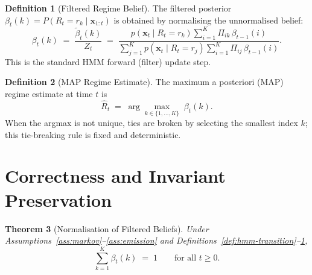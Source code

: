 \documentclass[12pt,openany]{book}
\newcommand{\bfx}{\mathbf{x}}
\numberwithin{equation}{chapter}
\theoremstyle{plain}
\newtheorem{theorem}{Theorem}[chapter]
\theoremstyle{definition}
\newtheorem{definition}[theorem]{Definition}
\theoremstyle{remark}
\numberwithin{equation}{chapter}
\theoremstyle{plain}
\begin{document}
\begin{definition}[Filtered Regime Belief]
\label{def:hmm-belief}
The filtered posterior $\beta_t(k) = P(R_t = r_k \mid \bfx_{1:t})$ is
obtained by normalising the unnormalised belief:
\begin{equation}
  \beta_t(k)
  \;=\;
  \frac{\tilde{\beta}_t(k)}{Z_t}
  \;=\;
  \frac{
    p\!\left(\bfx_t \mid R_t = r_k\right)
    \displaystyle\sum_{i=1}^{K}\Pi_{ik}\,\beta_{t-1}(i)
  }{
    \displaystyle\sum_{j=1}^{K}
    p\!\left(\bfx_t \mid R_t = r_j\right)
    \displaystyle\sum_{i=1}^{K}\Pi_{ij}\,\beta_{t-1}(i)
  }.
  \label{eq:hmm-update}
\end{equation}
This is the standard HMM forward (filter) update step.
\end{definition}

\begin{definition}[MAP Regime Estimate]
\label{def:map-regime}
The maximum a posteriori (MAP) regime estimate at time $t$ is
\begin{equation}
  \hat{R}_t
  \;=\;
  \arg\max_{k \in \{1,\ldots,K\}}\;\beta_t(k).
  \label{eq:map-regime}
\end{equation}
When the argmax is not unique, ties are broken by selecting the smallest
index $k$; this tie-breaking rule is fixed and deterministic.
\end{definition}

\section{Correctness and Invariant Preservation}
\label{sec:hmm-proofs}

\begin{theorem}[Normalisation of Filtered Beliefs]
\label{thm:hmm-norm}
Under Assumptions~\ref{ass:markov}--\ref{ass:emission} and
Definitions~\ref{def:hmm-transition}--\ref{def:hmm-belief},
\begin{equation}
  \sum_{k=1}^{K}\beta_t(k) \;=\; 1
  \qquad \text{for all } t \geq 0.
  \label{eq:hmm-norm-claim}
\end{equation}
\end{theorem}
\end{document}
